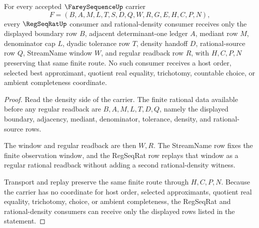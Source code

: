 \begin{theorem}
\label{thm:farey-sequence-regseqrat-density-root-obligation}
For every accepted $\FareySequenceUp$ carrier
$$
F=(B,A,M,L,T,S,D,Q,W,R,G,E,H,C,P,N),
$$
every $\RegSeqRatUp$ consumer and rational-density consumer receives only the displayed boundary row $B$, adjacent determinant-one ledger $A$, mediant row $M$, denominator cap $L$, dyadic tolerance row $T$, density handoff $D$, rational-source row $Q$, StreamName window $W$, and regular readback row $R$, with $H,C,P,N$ preserving that same finite route. No such consumer receives a host order, selected best approximant, quotient real equality, trichotomy, countable choice, or ambient completeness coordinate.
\end{theorem}
\begin{proof}
Read the density side of the carrier. The finite rational data available before any regular readback are $B,A,M,L,T,D,Q$, namely the displayed boundary, adjacency, mediant, denominator, tolerance, density, and rational-source rows.

The window and regular readback are then $W,R$. The StreamName row fixes the finite observation window, and the RegSeqRat row replays that window as a regular rational readback without adding a second rational-density witness.

Transport and replay preserve the same finite route through $H,C,P,N$. Because the carrier has no coordinate for host order, selected approximants, quotient real equality, trichotomy, choice, or ambient completeness, the RegSeqRat and rational-density consumers can receive only the displayed rows listed in the statement.
\end{proof}

